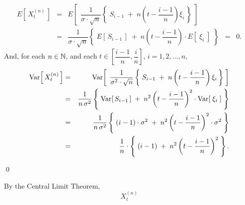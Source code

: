 		\begin{eqnarray*}
		E\!\left[\,X^{(n)}_{t}\,\right]
		&=&
		E\!\left[\;\,
		\dfrac{1}{\sigma\cdot\sqrt{n}}
		\left\{\;
		S_{i-1} \;+\; n\left(t - \dfrac{i-1}{n}\right)\xi_{i}
		\,\right\}
		\;\right]
		\\
		& = &
		\dfrac{1}{\sigma\cdot\sqrt{n}}
		\left\{\;
		E\!\left[\, S_{i-1}\,\right] \;+\; n\left(t - \dfrac{i-1}{n}\right)\cdot E\!\left[\;\xi_{i}\;\right]
		\;\right\}
		\;\; = \;\; 0.
		\end{eqnarray*}
		And, for each $n \in \mathbb{N}$, and each $t \in \left[\dfrac{i-1}{n},\dfrac{i}{n}\right]$, $i = 1,2,\ldots,n$, 
		\begin{eqnarray*}
		\textnormal{Var}\!\left[\,X^{(n)}_{t}\,\right]
		&=&
		\textnormal{Var}\!\left[\;\,
		\dfrac{1}{\sigma^{2}\cdot\sqrt{n}}
		\left\{\;
		S_{i-1} \;+\; n\left(t - \dfrac{i-1}{n}\right)\xi_{i}
		\,\right\}
		\;\right]
		\\
		& = &
		\dfrac{1}{n\,\sigma^{2}}
		\left\{\;
		\textnormal{Var}\!\left[\, S_{i-1}\,\right] \;+\; n^{2}\left(t - \dfrac{i-1}{n}\right)^{2}\cdot \textnormal{Var}\!\left[\;\xi_{i}\;\right]
		\;\right\}
		\\
		& = &
		\dfrac{1}{n\,\sigma^{2}}
		\left\{\;
		(i-1)\cdot\sigma^{2} \;+\; n^{2}\left(t - \dfrac{i-1}{n}\right)^{2}\cdot\sigma^{2}
		\;\right\}
		\\
		& = &
		\dfrac{1}{n}\cdot
		\left\{\;
		(i-1) \;+\; n^{2}\left(t - \dfrac{i-1}{n}\right)^{2}
		\;\right\}.
		\end{eqnarray*}

\qed

\vskip 0.5cm
\begin{remark}
\mbox{}
\vskip 0.0cm
\noindent
By the Central Limit Theorem,
\begin{equation*}
X^{(n)}_{t}
\end{equation*}
\end{remark}

\renewcommand{\theenumi}{\roman{enumi}}
\renewcommand{\labelenumi}{\textnormal{(\theenumi)}$\;\;$}

